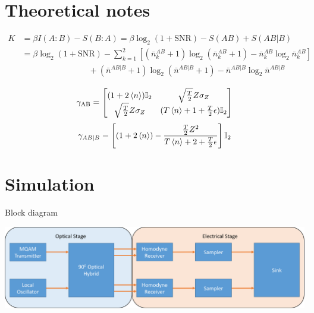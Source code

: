 \documentclass{beamer}
\begin{document}
\section{Theoretical notes}
\begin{frame}[t]
\begin{align*}
K&=\beta I(A:B)-S(B:A) = \beta\log_2(1+\text{SNR})-S(AB)+S(AB|B)\\
&=\beta\log_2(1+\text{SNR}) -\sum_{k=1}^2\left[(\bar{n}_k^{AB}+1)\log_2(\bar{n}_k^{AB}+1)-\bar{n}_k^{AB}\log_2\bar{n}_k^{AB}\right]\\
&\qquad {} \qquad {}  \qquad {} \qquad {}   +(\bar{n}^{AB|B}+1)\log_2(\bar{n}^{AB|B}+1)-\bar{n}^{AB|B}\log_2\bar{n}^{AB|B}
\end{align*}
\end{frame}

\begin{frame}[t]
\begin{align*}
\gamma_\text{AB}=\left[
\begin{matrix}
(1+2\braket{n})\mathbb{I}_2 & \sqrt{\frac{T}{2}}Z\sigma_Z \\
\sqrt{\frac{T}{2}}Z\sigma_Z & (T\braket{n}+1+\frac{T}{2}\epsilon)\mathbb{I}_2 
\end{matrix}
\right]
\end{align*}
\begin{align*}
\gamma_{AB|B}=\left[(1+2\braket{n})-\frac{\frac{T}{2}Z^2}{T\braket{n}+2+\frac{T}{2}\epsilon}\right]\mathbb{I}_2
\end{align*}
\end{frame}

\section{Simulation}
\begin{frame}[t]{Block diagram}
\begin{center}
\includegraphics[width=\linewidth]{blockdiagramsimulation.png}
\end{center}
\end{frame}
\end{document}
